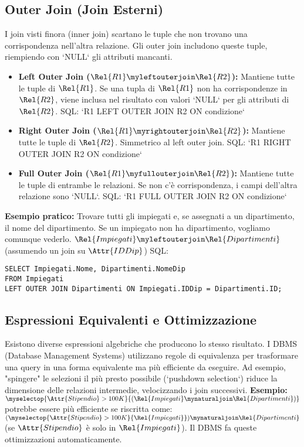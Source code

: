 \subsection{Outer Join (Join Esterni)}
I join visti finora (inner join) scartano le tuple che non trovano una corrispondenza nell'altra relazione. Gli outer join includono queste tuple, riempiendo con `NULL` gli attributi mancanti.
\begin{itemize}
	\item \textbf{Left Outer Join ($\Rel{R1} \myleftouterjoin \Rel{R2}$):} Mantiene tutte le tuple di $\Rel{R1}$. Se una tupla di $\Rel{R1}$ non ha corrispondenze in $\Rel{R2}$, viene inclusa nel risultato con valori `NULL` per gli attributi di $\Rel{R2}$.
	SQL: `R1 LEFT OUTER JOIN R2 ON condizione`
	\item \textbf{Right Outer Join ($\Rel{R1} \myrightouterjoin \Rel{R2}$):} Mantiene tutte le tuple di $\Rel{R2}$. Simmetrico al left outer join.
	SQL: `R1 RIGHT OUTER JOIN R2 ON condizione`
	\item \textbf{Full Outer Join ($\Rel{R1} \myfullouterjoin \Rel{R2}$):} Mantiene tutte le tuple di entrambe le relazioni. Se non c'è corrispondenza, i campi dell'altra relazione sono `NULL`.
	SQL: `R1 FULL OUTER JOIN R2 ON condizione`
\end{itemize}
\textbf{Esempio pratico:} Trovare tutti gli impiegati e, se assegnati a un dipartimento, il nome del dipartimento. Se un impiegato non ha dipartimento, vogliamo comunque vederlo.
$\Rel{Impiegati} \myleftouterjoin \Rel{Dipartimenti}$ (assumendo un join su $\Attr{IDDip}$)
SQL:
\begin{verbatim}
SELECT Impiegati.Nome, Dipartimenti.NomeDip
FROM Impiegati
LEFT OUTER JOIN Dipartimenti ON Impiegati.IDDip = Dipartimenti.ID;
\end{verbatim}

\subsection{Espressioni Equivalenti e Ottimizzazione}
Esistono diverse espressioni algebriche che producono lo stesso risultato. I DBMS (Database Management Systems) utilizzano regole di equivalenza per trasformare una query in una forma equivalente ma più efficiente da eseguire.
Ad esempio, "spingere" le selezioni il più presto possibile (`pushdown selection`) riduce la dimensione delle relazioni intermedie, velocizzando i join successivi.
\textbf{Esempio:}
$\myselectop{\Attr{Stipendio}>100K}{(\Rel{Impiegati} \mynaturaljoin \Rel{Dipartimenti})}$
potrebbe essere più efficiente se riscritta come:
$(\myselectop{\Attr{Stipendio}>100K}{\Rel{Impiegati}}) \mynaturaljoin \Rel{Dipartimenti}$
(se $\Attr{Stipendio}$ è solo in $\Rel{Impiegati}$). Il DBMS fa queste ottimizzazioni automaticamente.

